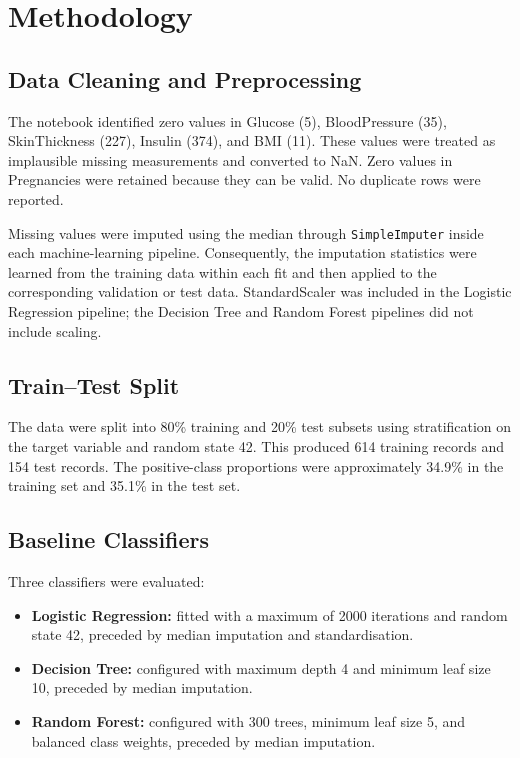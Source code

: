 \documentclass[12pt,a4paper]{article}
\begin{document}
\clearpage
\section{Methodology}
\subsection{Data Cleaning and Preprocessing}
The notebook identified zero values in Glucose (5), BloodPressure (35), SkinThickness (227), Insulin (374), and BMI (11). These values were treated as implausible missing measurements and converted to NaN. Zero values in Pregnancies were retained because they can be valid. No duplicate rows were reported.

Missing values were imputed using the median through \texttt{SimpleImputer} inside each machine-learning pipeline. Consequently, the imputation statistics were learned from the training data within each fit and then applied to the corresponding validation or test data. StandardScaler was included in the Logistic Regression pipeline; the Decision Tree and Random Forest pipelines did not include scaling.

\subsection{Train--Test Split}
The data were split into 80\% training and 20\% test subsets using stratification on the target variable and random state 42. This produced 614 training records and 154 test records. The positive-class proportions were approximately 34.9\% in the training set and 35.1\% in the test set.

\subsection{Baseline Classifiers}
Three classifiers were evaluated:
\begin{itemize}
    \item \textbf{Logistic Regression:} fitted with a maximum of 2000 iterations and random state 42, preceded by median imputation and standardisation.
    \item \textbf{Decision Tree:} configured with maximum depth 4 and minimum leaf size 10, preceded by median imputation.
    \item \textbf{Random Forest:} configured with 300 trees, minimum leaf size 5, and balanced class weights, preceded by median imputation.
\end{itemize}
\end{document}
